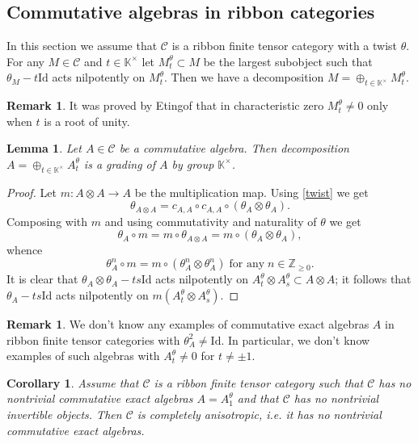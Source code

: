 \documentclass{amsart}
\newtheorem{lemma}[theorem]{Lemma}
\newtheorem{corollary}[theorem]{Corollary}
\theoremstyle{definition}
\newtheorem{remark}[theorem]{Remark}
\newcommand{\C}{\mathcal{C}}
\newcommand{\Z}{\mathbb{Z}}
\newcommand{\K}{\mathbb{K}}
\newcommand{\Id}{\text{Id}}
\numberwithin{equation}{section}
\begin{document}
\subsection{Commutative algebras in ribbon categories} In this section we assume 
that $\C$ is a ribbon finite tensor category with a twist $\theta$. For any $M\in \C$
and $t \in \K^\times$ let $M_t^\theta \subset M$ be the largest subobject such
that $\theta_M-t\Id$ acts nilpotently on $M_t^\theta$. Then we have a decomposition
$M=\oplus_{t\in \K^\times}M_t^\theta$.

\begin{remark}
    It was proved by Etingof \cite{Ev} that in characteristic zero $M_t^\theta \ne 0$ only when $t$ is a root of unity.
\end{remark}

\begin{lemma}\label{tdec}
Let $A\in \C$ be a commutative algebra. Then decomposition $A=\oplus_{t\in \K^\times}A_t^\theta$
is a grading of $A$ by group $\K^\times$.
\end{lemma}

\begin{proof}
    Let $m:A \otimes A\to A$ be the multiplication map. Using \eqref{twist}
    we get
    $$\theta_{A\otimes A}=c_{A,A}\circ c_{A,A}\circ (\theta_A\otimes \theta_A).$$
    Composing with $m$ and using commutativity and naturality of $\theta$ we get
    $$\theta_A\circ m=m\circ \theta_{A\otimes A}=m\circ (\theta_A\otimes \theta_A),$$
    whence 
    $$\theta_A^n\circ m=m\circ (\theta_A^n\otimes \theta_A^n)\;
    \mbox{for any}\; n\in \Z_{\ge 0}.$$
    It is clear that $\theta_A\otimes \theta_A-ts\Id$ acts nilpotently on $A_t^\theta \otimes A_s^\theta \subset A\otimes A$; it follows that $\theta_A-ts\Id$ acts nilpotently on
    $m(A_t^\theta \otimes A_s^\theta)$.
\end{proof}

\begin{remark}
    We don't know any examples of commutative exact algebras $A$ in ribbon finite tensor
    categories with $\theta_A^2\ne \Id$. In particular, we don't know examples of such algebras
    with $A_t^\theta \ne 0$ for $t\ne \pm 1$.
\end{remark}

\begin{corollary}\label{red}
    Assume that $\C$ is a ribbon finite tensor category such that $\C$ has no 
    nontrivial commutative exact algebras $A=A_1^\theta$ and that $\C$ has
    no nontrivial invertible objects. Then $\C$ is completely anisotropic, i.e.
    it has no nontrivial commutative exact algebras.
\end{corollary}
\end{document}
